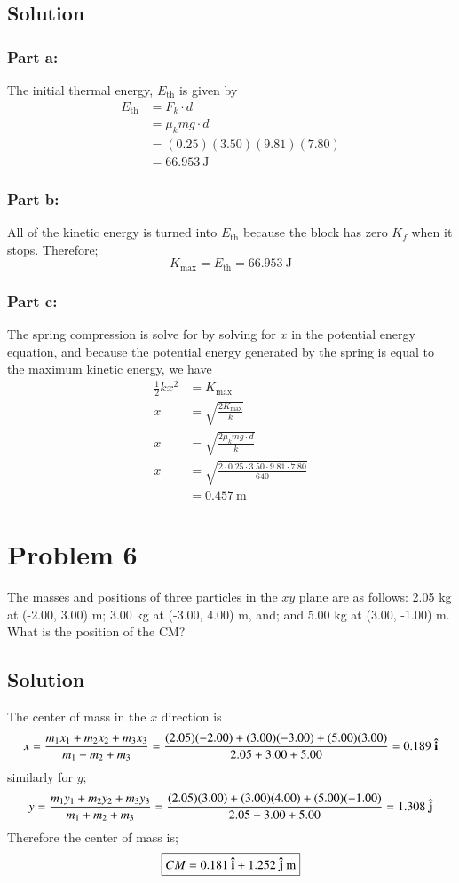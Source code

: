\documentclass{article}
\newcommand{\Eth}{E_{\text{th}}}
\begin{document}
\subsection*{Solution}
\subsubsection*{Part a:}
The initial thermal energy, $E_{\text{th}}$ is given by
\begin{align*}
	\Eth &= F_k \cdot d \\
	     &= \mu_k mg \cdot d \\
	     &= (0.25)(3.50)(9.81)(7.80) \\
	     &= \boxed{66.953\ \text{J}}
\end{align*}

\subsubsection*{Part b:}
All of the kinetic energy is turned into $\Eth$ because the block has zero $K_f$ when it stops. Therefore;
\[
	K_\text{max} = \Eth = \boxed{66.953\ \text{J}}
\]

\subsubsection*{Part c:}
The spring compression is solve for by solving for $x$ in the potential energy equation, and because the potential energy generated by the spring is equal to the maximum kinetic energy, we have
\begin{align*}
	\frac{1}{2}kx^2 &= K_\text{max} \\
	x &= \sqrt{\frac{2 K_\text{max}}{k}} \\
	x &= \sqrt{\frac{2 \mu_k mg \cdot d}{k}} \\
	x &= \sqrt{\frac{2 \cdot 0.25 \cdot 3.50 \cdot 9.81 \cdot 7.80}{640}} \\
	  &= \boxed{0.457 \ \text{m}}
\end{align*}



\section*{Problem 6}
The masses and positions of three particles in the $xy$ plane are as follows: 2.05 kg at (-2.00, 3.00) m; 3.00 kg
at (-3.00, 4.00) m, and; and 5.00 kg at (3.00, -1.00) m. What is the position of the CM?

\subsection*{Solution}
The center of mass in the $x$ direction is
\[
	x = \frac{m_1 x_1 + m_2 x_2 + m_3 x_3}{m_1 + m_2 + m_3} = \frac{(2.05)(-2.00)+(3.00)(-3.00)+(5.00)(3.00)}{2.05 + 3.00 + 5.00} = 0.189\ \vu i
\]
similarly for $y$;
\[
	y = \frac{m_1 y_1 + m_2 y_2 + m_3 y_3}{m_1 + m_2 + m_3} = \frac{(2.05)(3.00) + (3.00)(4.00) + (5.00)(-1.00)}{2.05 + 3.00 + 5.00} = 1.308\ \vu j
\]
Therefore the center of mass is;
\[
	\boxed{ CM = 0.181\ \vu i + 1.252\ \vu j \ \text{m}}
\]
\end{document}
